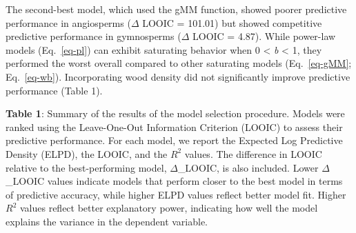 \documentclass[
  12pt,
  letterpaper,
  DIV=11,
  numbers=noendperiod]{scrartcl}
\begin{document}
The second-best model, which used the gMM function, showed poorer
predictive performance in angiosperms (\(\Delta\) LOOIC = 101.01) but
showed competitive predictive performance in gymnosperms (\(\Delta\)
LOOIC = 4.87). While power-law models (Eq.~\ref{eq-pl}) can exhibit
saturating behavior when 0 \textless{} \emph{b} \textless{} 1, they
performed the worst overall compared to other saturating models
(Eq.~\ref{eq-gMM}; Eq.~\ref{eq-wb}). Incorporating wood density did not
significantly improve predictive performance (Table 1).

\textbf{Table 1}: Summary of the results of the model selection
procedure. Models were ranked using the Leave-One-Out Information
Criterion (LOOIC) to assess their predictive performance. For each
model, we report the Expected Log Predictive Density (ELPD), the LOOIC,
and the \(R^2\) values. The difference in LOOIC relative to the
best-performing model, \(\Delta\)\_LOOIC, is also included. Lower
\(\Delta\)\_LOOIC values indicate models that perform closer to the best
model in terms of predictive accuracy, while higher ELPD values reflect
better model fit. Higher \(R^2\) values reflect better explanatory
power, indicating how well the model explains the variance in the
dependent variable.

\newpage

\begingroup\fontsize{10}{12}\selectfont
\end{document}
